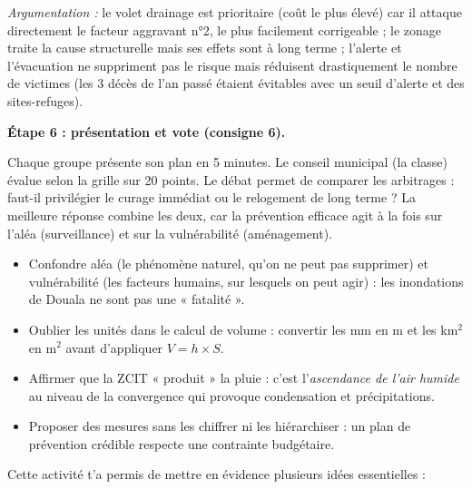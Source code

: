 \documentclass[11pt]{article}
\newcommand{\cle}[1]{{\popxbold\color{popdark}#1}}
\newcounter{popsec}
\newcounter{popsub}
\newcommand{\courssub}[1]{%
  \stepcounter{popsub}%
  \par\vspace{9pt}\noindent{\popxbold\fontsize{11.5}{13}\selectfont\color{popink}{\color{poporange}\thepopsec.\thepopsub}\hspace{6pt}#1}\par\nopagebreak\vspace{4pt}
}
\begin{document}
\begin{exoresolu}
\emph{Argumentation :} le volet drainage est prioritaire (coût le plus élevé) car il attaque directement le facteur aggravant n°2, le plus facilement corrigeable ; le zonage traite la cause structurelle mais ses effets sont à long terme ; l'alerte et l'évacuation ne suppriment pas le risque mais réduisent drastiquement le nombre de victimes (les 3 décès de l'an passé étaient évitables avec un seuil d'alerte et des sites-refuges).

\textbf{Étape 6 : présentation et vote (consigne 6).}

Chaque groupe présente son plan en 5 minutes. Le conseil municipal (la classe) évalue selon la grille sur 20 points. Le débat permet de comparer les arbitrages : faut-il privilégier le curage immédiat ou le relogement de long terme ? La meilleure réponse combine les deux, car la prévention efficace agit à la fois sur l'aléa (surveillance) et sur la vulnérabilité (aménagement).
\end{exoresolu}

\begin{attention}
\begin{itemize}
\item Confondre \cle{aléa} (le phénomène naturel, qu'on ne peut pas supprimer) et \cle{vulnérabilité} (les facteurs humains, sur lesquels on peut agir) : les inondations de Douala ne sont pas une « fatalité ».
\item Oublier les unités dans le calcul de volume : convertir les mm en m et les km$^2$ en m$^2$ avant d'appliquer $V = h \times S$.
\item Affirmer que la ZCIT « produit » la pluie : c'est l'\emph{ascendance de l'air humide} au niveau de la convergence qui provoque condensation et précipitations.
\item Proposer des mesures sans les chiffrer ni les hiérarchiser : un plan de prévention crédible respecte une contrainte budgétaire.
\end{itemize}
\end{attention}

\courssub{Bilan de l'activité}

Cette activité t'a permis de mettre en évidence plusieurs idées essentielles :
\end{document}
